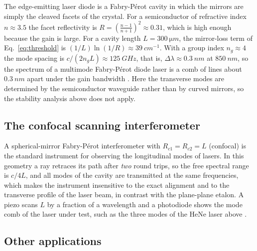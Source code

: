 \documentclass[11pt,a4paper]{article}
\newcommand{\FP}{Fabry-P\'erot}
\begin{document}
	The edge-emitting laser diode is a \FP{} cavity in which the mirrors are simply the cleaved facets of the crystal. For a semiconductor of refractive index $n\approx3.5$ the facet reflectivity is $R=\left(\frac{n-1}{n+1}\right)^2\approx0.31$, which is high enough because the gain is large. For a cavity length $L=\SI{300}{\micro m}$, the mirror-loss term of Eq.~\eqref{eq:threshold} is $(1/L)\ln(1/R)\approx\SI{39}{cm^{-1}}$. With a group index $n_g\approx4$ the mode spacing is $c/(2n_gL)\approx\SI{125}{GHz}$, that is, $\Delta\lambda\approx\SI{0.3}{nm}$ at $\SI{850}{nm}$, so the spectrum of a multimode \FP{} diode laser is a comb of lines about $\SI{0.3}{nm}$ apart under the gain bandwidth \cite{Coldren}. Here the transverse modes are determined by the semiconductor waveguide rather than by curved mirrors, so the stability analysis above does not apply.
	
	\subsection{The confocal scanning interferometer}
	
	A spherical-mirror \FP{} interferometer with $R_{c1}=R_{c2}=L$ (confocal) is the standard instrument for observing the longitudinal modes of lasers. In this geometry a ray retraces its path after \emph{two} round trips, so the free spectral range is $c/4L$, and all modes of the cavity are transmitted at the same frequencies, which makes the instrument insensitive to the exact alignment and to the transverse profile of the laser beam, in contrast with the plane-plane etalon. A piezo scans $L$ by a fraction of a wavelength and a photodiode shows the mode comb of the laser under test, such as the three modes of the HeNe laser above \cite{Hernandez,Vaughan}.
	
	\subsection{Other applications}
	
\end{document}
